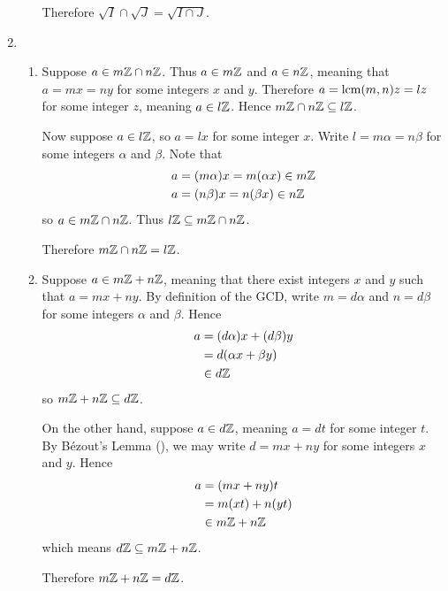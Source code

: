 \begin{enumerate}
\begin{enumerate}[label=(\alph*)]
        Therefore $\sqrt{I}\cap\sqrt{J} = \sqrt{I\cap J}$.
    \end{enumerate}

    \item \begin{enumerate}[label=(\alph*)]
        \item Suppose $a \in m\mathbb{Z}\cap n\mathbb{Z}$. Thus $a \in m\mathbb{Z}$ and $a \in n\mathbb{Z}$, meaning that $a = mx = ny$ for some integers $x$ and $y$. Therefore $a = \mathrm{lcm}(m,n)z = lz$ for some integer $z$, meaning $a \in l\mathbb{Z}$. Hence $m\mathbb{Z} \cap n\mathbb{Z} \subseteq l\mathbb{Z}$.
        
        Now suppose $a \in l\mathbb{Z}$, so $a = lx$ for some integer $x$. Write $l = m\alpha = n\beta$ for some integers $\alpha$ and $\beta$. Note that
        \begin{align*}
            a &= (m\alpha)x = m(\alpha x) \in m\mathbb{Z}\\
            a &= (n\beta)x = n(\beta x) \in n\mathbb{Z}
        \end{align*}
        so $a \in m\mathbb{Z} \cap n\mathbb{Z}$. Thus $l\mathbb{Z} \subseteq m\mathbb{Z} \cap n\mathbb{Z}$.

        Therefore $m\mathbb{Z}\cap n\mathbb{Z} = l\mathbb{Z}$.

        \item Suppose $a \in m\mathbb{Z} + n\mathbb{Z}$, meaning that there exist integers $x$ and $y$ such that $a = mx + ny$. By definition of the GCD, write $m = d\alpha$ and $n = d\beta$ for some integers $\alpha$ and $\beta$. Hence
        \begin{align*}
            a &= (d\alpha)x + (d\beta)y\\
            &= d(\alpha x + \beta y)\\
            &\in d\mathbb{Z}
        \end{align*}
        so $m\mathbb{Z} + n\mathbb{Z} \subseteq d\mathbb{Z}$.

        On the other hand, suppose $a \in d\mathbb{Z}$, meaning $a = dt$ for some integer $t$. By B\'{e}zout's Lemma (), we may write $d = mx + ny$ for some integers $x$ and $y$. Hence
        \begin{align*}
            a &= (mx + ny)t\\
            &= m(xt) + n(yt)\\
            &\in m\mathbb{Z} + n\mathbb{Z}
        \end{align*}
        which means $d\mathbb{Z} \subseteq m\mathbb{Z} + n\mathbb{Z}$.

        Therefore $m\mathbb{Z} + n\mathbb{Z} = d\mathbb{Z}$.
    \end{enumerate}


\end{enumerate}
